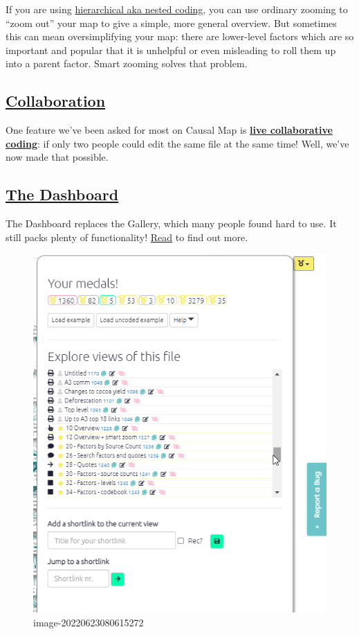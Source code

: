 \documentclass[
]{book}
\begin{document}
If you are using \protect\hyperlink{xsimplifying-with-hierarchical}{hierarchical aka nested coding}, you can use ordinary zooming to ``zoom out'' your map to give a simple, more general overview. But sometimes this can mean oversimplifying your map: there are lower-level factors which are so important and popular that it is unhelpful or even misleading to roll them up into a parent factor. Smart zooming solves that problem.

\hypertarget{collaboration}{%
\subsection{\texorpdfstring{\protect\hyperlink{ux5cux23collaboration}{Collaboration}}{Collaboration}}\label{collaboration}}

One feature we've been asked for most on Causal Map is \textbf{\href{https://guide.causalmap.app/collaborating-at-causal-map.html\#details}{live collaborative coding}}: if only two people could edit the same file at the same time! Well, we've now made that possible.

\hypertarget{the-dashboard}{%
\subsection{\texorpdfstring{\protect\hyperlink{dashboard}{The Dashboard}}{The Dashboard}}\label{the-dashboard}}

The Dashboard replaces the Gallery, which many people found hard to use. It still packs plenty of functionality! \protect\hyperlink{dashboard}{Read} to find out more.

\begin{figure}
\centering
\includegraphics{_assets/image-20220623080615272.png}
\caption{image-20220623080615272}
\end{figure}
\end{document}
